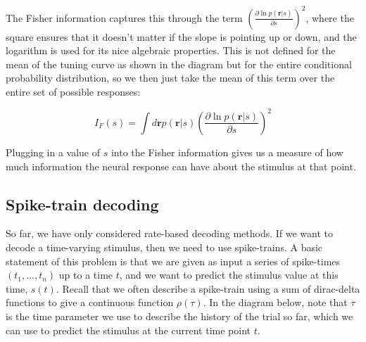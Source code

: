 \documentclass{article}
\begin{document}
\begin{figure}[H]

\end{figure}

The Fisher information captures this through the term $\left ( \frac{\partial\ln p(\bm{r}|s)}{\partial s} \right)^2$, where the square ensures that it doesn't matter if the slope is pointing up or down, and the logarithm is used for its nice algebraic properties. This is not defined for the mean of the tuning curve as shown in the diagram but for the entire conditional probability distribution, so we then just take the mean of this term over the entire set of possible responses:

\begin{equation*}
    I_F(s) = \int d\bm{r} p(\bm{r}|s)\left ( \frac{\partial\ln p(\bm{r}|s)}{\partial s} \right)^2
\end{equation*}

Plugging in a value of $s$ into the Fisher information gives us a measure of how much information the neural response can have about the stimulus at that point.

\subsection{Spike-train decoding}

So far, we have only considered rate-based decoding methods. If we want to decode a time-varying stimulus, then we need to use spike-trains. A basic statement of this problem is that we are given as input a series of spike-times $(t_1,...,t_n)$ up to a time $t$, and we want to predict the stimulus value at this time, $s(t)$. Recall that we often describe a spike-train using a sum of dirac-delta functions to give a continuous function $\rho (\tau)$. In the diagram below, note that $\tau$ is the time parameter we use to describe the history of the trial so far, which we can use to predict the stimulus at the current time point $t$.\\
\end{document}
